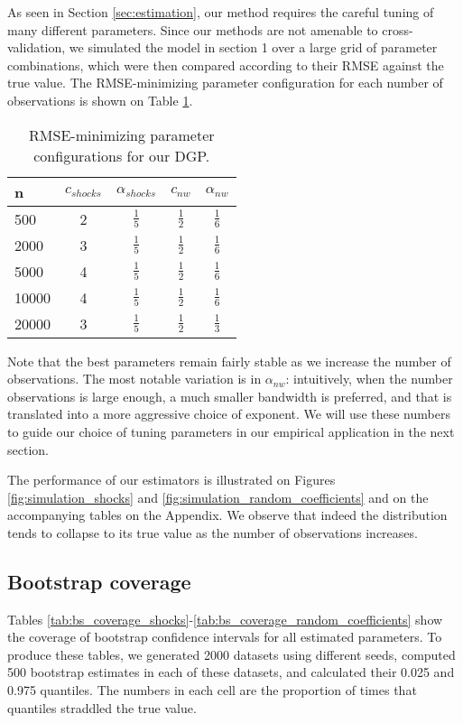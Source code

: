 As seen in Section \ref{sec:estimation}, our method requires the careful tuning of many different parameters. Since our methods are not amenable to cross-validation, we simulated the model in section 1 over a large grid of parameter combinations, which were then compared according to their RMSE against the true value. The RMSE-minimizing parameter configuration for each number of observations is shown on Table \ref{tab:best_parameters}.

\begin{table}[htdp]
  \centering
  \renewcommand{\arraystretch}{1.6}
  \begin{tabular}{l|cccc}
    n & $c_{shocks}$ & $\alpha_{shocks}$ & $c_{nw}$ & $\alpha_{nw}$ \\  \hline
    500 & 2 & $\frac{1}{5}$ & $\frac{1}{2}$ & $\frac{1}{6}$ \\
    2000 & 3 & $\frac{1}{5}$ & $\frac{1}{2}$ & $\frac{1}{6}$ \\
    5000 & 4 & $\frac{1}{5}$ & $\frac{1}{2}$ & $\frac{1}{6}$ \\
    10000 & 4 & $\frac{1}{5}$ & $\frac{1}{2}$ & $\frac{1}{6}$ \\
    20000 & 3 & $\frac{1}{5}$ & $\frac{1}{2}$ & $\frac{1}{3}$ \\
  \end{tabular}
  \caption{RMSE-minimizing parameter configurations for our DGP.}
  \label{tab:best_parameters}
\end{table}
 
Note that the best parameters remain fairly stable as we increase the number of observations. The most notable variation is in $\alpha_{nw}$: intuitively, when the number observations is large enough, a much smaller bandwidth is preferred, and that is translated into a more aggressive choice of exponent. We will use these numbers to guide our choice of tuning parameters in our empirical application in the next section.

The performance of our estimators is illustrated on Figures \ref{fig:simulation_shocks} and \ref{fig:simulation_random_coefficients} and on the accompanying tables on the Appendix. We observe that indeed the distribution tends to collapse to its true value as the number of observations increases. 


\subsection{Bootstrap coverage}

Tables \ref{tab:bs_coverage_shocks}-\ref{tab:bs_coverage_random_coefficients} show the coverage of bootstrap confidence intervals for all estimated parameters. To produce these tables, we generated 2000 datasets using different seeds, computed 500 bootstrap estimates in each of these datasets, and calculated their 0.025 and 0.975 quantiles. The numbers in each cell are the proportion of times that quantiles straddled the true value.

